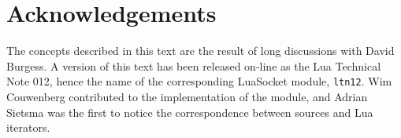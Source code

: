 \documentclass[10pt]{article}
\begin{document}
\section{Acknowledgements}

The concepts described in this text are the result of  long
discussions with David Burgess. A version of this text has
been released on-line as the Lua Technical Note 012, hence
the name of the corresponding LuaSocket module,
\texttt{ltn12}.  Wim Couwenberg contributed to the
implementation of the module, and Adrian Sietsma was the
first to notice the correspondence between sources and Lua
iterators. 
\end{document}
